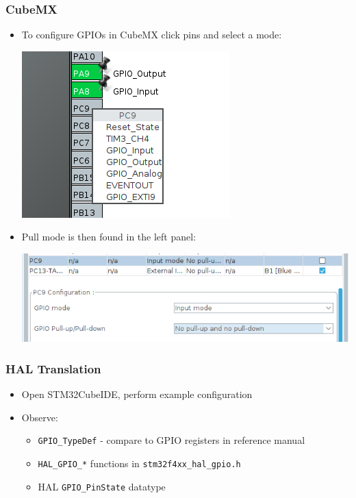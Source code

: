 \documentclass[14pt]{beamer}
\begin{document}
\begin{frame}[fragile]
\frametitle{CubeMX}
\begin{itemize}
\item To configure GPIOs in CubeMX click pins and select a mode:
\begin{center}
\includegraphics[width=0.3\framewidth]{gpio1}
\end{center}

\item Pull mode is then found in the left panel:
\begin{center}
\includegraphics[width=0.7\framewidth]{gpio2}
\end{center}

\end{itemize}
\end{frame}

\begin{frame}[fragile]
\frametitle{HAL Translation}
\begin{itemize}
\item Open STM32CubeIDE, perform example configuration
\item Observe:
	\begin{itemize}
		\item \texttt{GPIO\_TypeDef} - compare to GPIO registers in reference manual
		\item \texttt{HAL\_GPIO\_*} functions in \texttt{stm32f4xx\_hal\_gpio.h}
		\item HAL \texttt{GPIO\_PinState} datatype
	\end{itemize}
\end{itemize}
\end{frame}
\end{document}
